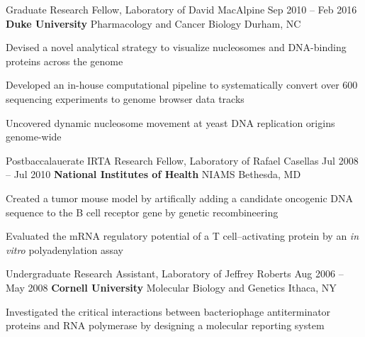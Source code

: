 
\begin{resentries}

  \resentry
    {Graduate Research Fellow, Laboratory of David MacAlpine}
    {Sep 2010 -- Feb 2016}
    {\textbf{Duke University} \xspace \bullet \xspace \xspace Pharmacology and Cancer Biology} %
    {Durham, NC} %
    {
      \begin{cvitems} %
        \item{Devised a novel analytical strategy to visualize nucleosomes and DNA-binding proteins across the genome}
        \item{Developed an in-house computational pipeline to systematically convert over 600 sequencing experiments to genome browser data tracks}
        \item{Uncovered dynamic nucleosome movement at yeast DNA replication origins genome-wide} 
      \end{cvitems}
    }

  \resentry
    {Postbaccalauerate IRTA Research Fellow, Laboratory of Rafael Casellas}
    {Jul 2008 -- Jul 2010}
    {\textbf{National Institutes of Health} \xspace \bullet \xspace \xspace NIAMS}
    {Bethesda, MD}
    {
      \begin{cvitems} %
        \item{Created a tumor mouse model by artifically adding a candidate oncogenic DNA sequence to the B cell receptor gene by genetic recombineering}
        \item{Evaluated the mRNA regulatory potential of a T cell--activating protein by an \textit{in vitro} polyadenylation assay}
      \end{cvitems}
    }

  \resentry
    {Undergraduate Research Assistant, Laboratory of Jeffrey Roberts}
    {Aug 2006 -- May 2008}
    {\textbf{Cornell University} \xspace \bullet \xspace \xspace Molecular Biology and Genetics}
    {Ithaca, NY}
    {
      \begin{cvitems} %
        \item{Investigated the critical interactions between bacteriophage antiterminator proteins and RNA polymerase by designing a molecular reporting system}
      \end{cvitems}
    }

\end{resentries}
\vspace{-2mm}
